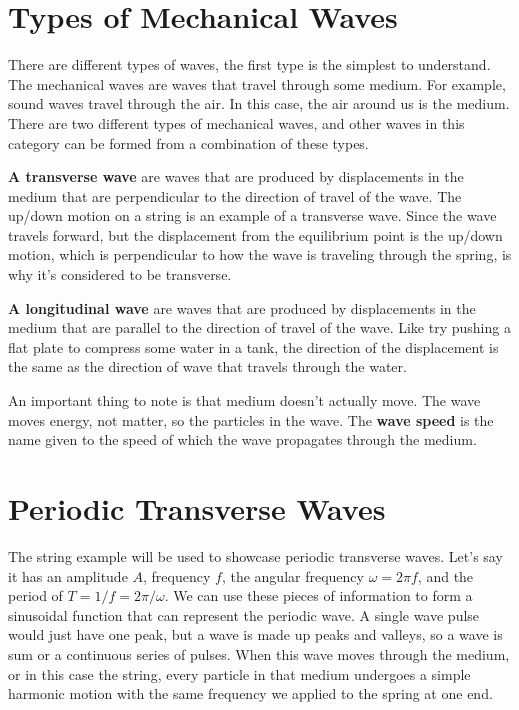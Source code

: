 \section{Types of Mechanical Waves}

There are different types of waves, the first type is the simplest to understand. The mechanical waves are waves that travel through some medium. For example, sound waves travel through the air. In this case, the air around us is the medium. There are two different types of mechanical waves, and other waves in this category can be formed from a combination of these types. 

\textbf{A transverse wave} are waves that are produced by displacements in the medium that are perpendicular to the direction of travel of the wave. The up/down motion on a string is an example of a transverse wave. Since the wave travels forward, but the displacement from the equilibrium point is the up/down motion, which is perpendicular to how the wave is traveling through the spring, is why it's considered to be transverse. 

\textbf{A longitudinal wave} are waves that are produced by displacements in the medium that are parallel to the direction of travel of the wave. Like try pushing a flat plate to compress some water in a tank, the direction of the displacement is the same as the direction of wave that travels through the water. 

An important thing to note is that medium doesn't actually move. The wave moves energy, not matter, so the particles in the wave. The \textbf{wave speed} is the name given to the speed of which the wave propagates through the medium. 

\section{Periodic Transverse Waves}
The string example will be used to showcase periodic transverse waves. 
Let's say it has an amplitude $A$, frequency $f$, the angular frequency $\omega = 2\pi f$, and the period of $T=1/f=2\pi /\omega$. We can use these pieces of information to form a sinusoidal function that can represent the periodic wave. A single wave pulse would just have one peak, but a wave is made up peaks and valleys, so a wave is sum or a continuous series of pulses. When this wave moves through the medium, or in this case the string, every particle in that medium undergoes a simple harmonic motion with the same frequency we applied to the spring at one end. 

